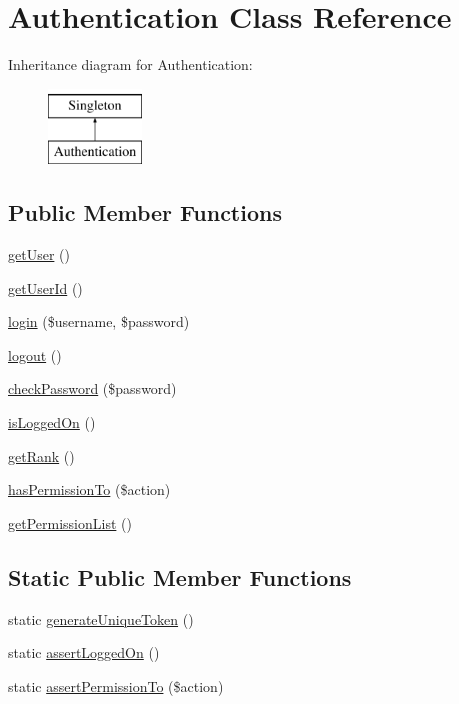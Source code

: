 \hypertarget{classAuthentication}{
\section{Authentication Class Reference}
\label{classAuthentication}
}
Inheritance diagram for Authentication:\begin{figure}[H]
\begin{center}
\leavevmode
\includegraphics[height=2.000000cm]{classAuthentication}
\end{center}
\end{figure}
\subsection*{Public Member Functions}
\begin{DoxyCompactItemize}
\item 
\hyperlink{classAuthentication_a3da927c6d0643db0d0048b5c21a92f93}{getUser} ()
\item 
\hyperlink{classAuthentication_aca16ed99ec2ce7b7a0213a4c718af004}{getUserId} ()
\item 
\hyperlink{classAuthentication_a505c6a692893f694cc2d63a102a03338}{login} (\$username, \$password)
\item 
\hyperlink{classAuthentication_a478caa2b82260f22462a243fdbabad2f}{logout} ()
\item 
\hyperlink{classAuthentication_a317b36d37a99df0476dd0ec55f52bf9d}{checkPassword} (\$password)
\item 
\hyperlink{classAuthentication_ad311beb355ff37fd815c0141cc7727f3}{isLoggedOn} ()
\item 
\hyperlink{classAuthentication_a06867283805ffd4e223167cc15bbd800}{getRank} ()
\item 
\hyperlink{classAuthentication_ad5d1fba33f4df315084335f57025eec6}{hasPermissionTo} (\$action)
\item 
\hyperlink{classAuthentication_a5e0187c1c057694e6dae84006a6944c7}{getPermissionList} ()
\end{DoxyCompactItemize}
\subsection*{Static Public Member Functions}
\begin{DoxyCompactItemize}
\item 
static \hyperlink{classAuthentication_a8df399ee7f9eca617e6249935dae2a88}{generateUniqueToken} ()
\item 
static \hyperlink{classAuthentication_a6e29c7efa70a367135d3e7bf464fad52}{assertLoggedOn} ()
\item 
static \hyperlink{classAuthentication_a11dc5e2b83d14bcbcc35c7dd5584a1e5}{assertPermissionTo} (\$action)
\end{DoxyCompactItemize}
